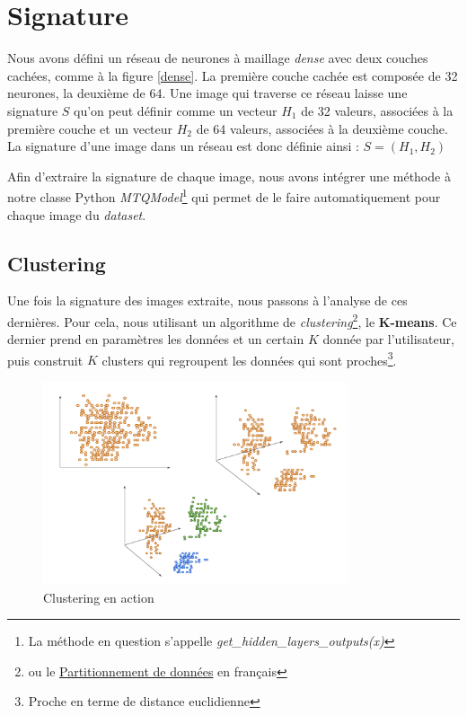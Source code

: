 \documentclass[oneside,13pt,a4paper]{report}
\begin{document}
\section{Signature}
\label{sig}

Nous avons défini un réseau de neurones à maillage \textit{dense} avec deux couches cachées, comme à la figure \ref{dense}. La première couche cachée est composée de 32 neurones, la deuxième de 64. Une image qui traverse ce réseau laisse une signature $S$ qu'on peut définir comme un vecteur $H_1$ de 32 valeurs, associées à la première couche et un vecteur $H_2$ de 64 valeurs, associées à la deuxième couche. La signature d'une image dans un réseau est donc définie ainsi : $ S = (H_1, H_2)$\cite{Patternsig}

Afin d'extraire la signature de chaque image, nous avons intégrer une méthode à notre classe Python \textit{MTQModel}\footnote{La méthode en question s'appelle \textit{get\_hidden\_layers\_outputs(x)}} qui permet de le faire automatiquement pour chaque image du \textit{dataset}.

\subsection{Clustering}

Une fois la signature des images extraite, nous passons à l'analyse de ces dernières. Pour cela, nous utilisant un algorithme de \textit{clustering}\footnote{ou le \href{https://fr.wikipedia.org/wiki/Partitionnement_de_donn\%C3\%A9es}{Partitionnement de données} en français}, le \textbf{K-means}. Ce dernier prend en paramètres les données et un certain $K$ donnée par l'utilisateur, puis construit $K$ clusters qui regroupent les données qui sont proches\footnote{Proche en terme de distance euclidienne}\cite{Kmeans}.

\begin{figure}[!h]
\center
\includegraphics[width=0.8\textwidth]{img/kmeans.png}
\caption{Clustering en action}
\end{figure}
\end{document}
